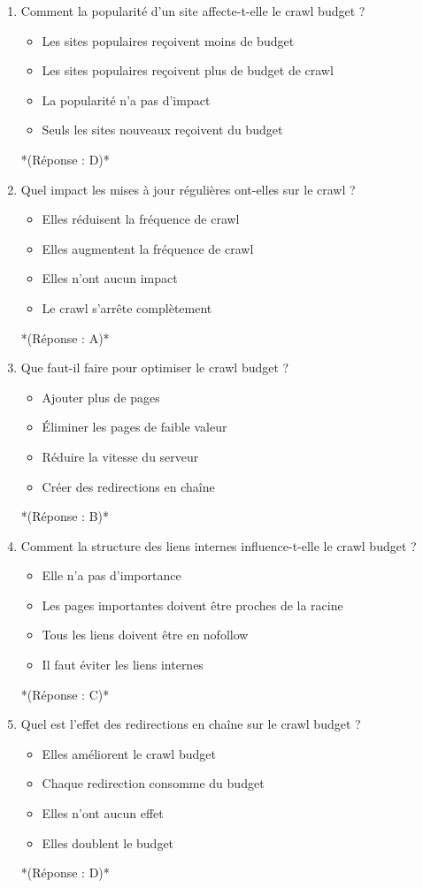 \documentclass[12pt,a4paper,twoside]{report}
\begin{document}
\begin{enumerate}
\item Comment la popularité d'un site affecte-t-elle le crawl budget ?
\begin{itemize}
\item[A)] Les sites populaires reçoivent moins de budget
\item[B)] Les sites populaires reçoivent plus de budget de crawl
\item[C)] La popularité n'a pas d'impact
\item[D)] Seuls les sites nouveaux reçoivent du budget
\end{itemize}
*(Réponse : D)*

\item Quel impact les mises à jour régulières ont-elles sur le crawl ?
\begin{itemize}
\item[A)] Elles réduisent la fréquence de crawl
\item[B)] Elles augmentent la fréquence de crawl
\item[C)] Elles n'ont aucun impact
\item[D)] Le crawl s'arrête complètement
\end{itemize}
*(Réponse : A)*

\item Que faut-il faire pour optimiser le crawl budget ?
\begin{itemize}
\item[A)] Ajouter plus de pages
\item[B)] Éliminer les pages de faible valeur
\item[C)] Réduire la vitesse du serveur
\item[D)] Créer des redirections en chaîne
\end{itemize}
*(Réponse : B)*

\item Comment la structure des liens internes influence-t-elle le crawl budget ?
\begin{itemize}
\item[A)] Elle n'a pas d'importance
\item[B)] Les pages importantes doivent être proches de la racine
\item[C)] Tous les liens doivent être en nofollow
\item[D)] Il faut éviter les liens internes
\end{itemize}
*(Réponse : C)*

\item Quel est l'effet des redirections en chaîne sur le crawl budget ?
\begin{itemize}
\item[A)] Elles améliorent le crawl budget
\item[B)] Chaque redirection consomme du budget
\item[C)] Elles n'ont aucun effet
\item[D)] Elles doublent le budget
\end{itemize}
*(Réponse : D)*


\end{enumerate}
\end{document}
